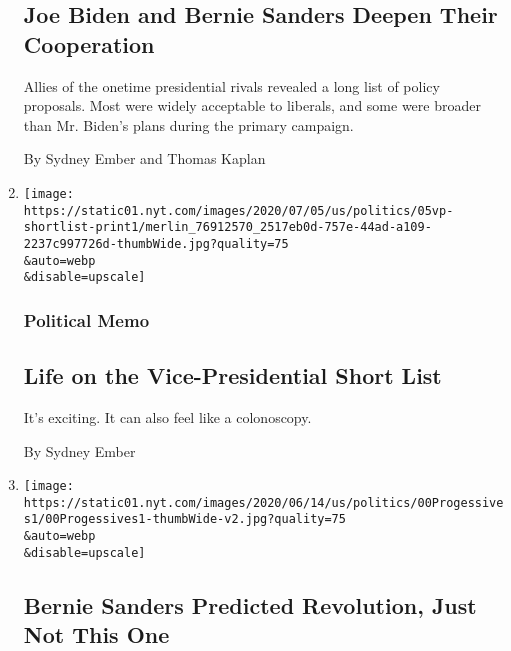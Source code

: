 \begin{enumerate}
  \hypertarget{joe-biden-and-bernie-sanders-deepen-their-cooperation}{%
  \subsection{Joe Biden and Bernie Sanders Deepen Their
  Cooperation}\label{joe-biden-and-bernie-sanders-deepen-their-cooperation}}

  Allies of the onetime presidential rivals revealed a long list of
  policy proposals. Most were widely acceptable to liberals, and some
  were broader than Mr. Biden's plans during the primary campaign.

  By Sydney Ember and Thomas Kaplan
\item
  \href{/2020/07/04/us/politics/biden-vice-president-.html}{}

  \texttt{[image: https://static01.nyt.com/images/2020/07/05/us/politics/05vp-shortlist-print1/merlin\_76912570\_2517eb0d-757e-44ad-a109-2237c997726d-thumbWide.jpg?quality=75\\\&auto=webp\\\&disable=upscale]}

  \hypertarget{political-memo}{%
  \subsubsection{Political Memo}\label{political-memo}}

  \hypertarget{life-on-the-vice-presidential-short-list}{%
  \subsection{Life on the Vice-Presidential Short
  List}\label{life-on-the-vice-presidential-short-list}}

  It's exciting. It can also feel like a colonoscopy.

  By Sydney Ember
\item
  \href{/2020/06/19/us/politics/bernie-sanders-protests.html}{}

  \texttt{[image: https://static01.nyt.com/images/2020/06/14/us/politics/00Progessives1/00Progessives1-thumbWide-v2.jpg?quality=75\\\&auto=webp\\\&disable=upscale]}

  \hypertarget{bernie-sanders-predicted-revolution-just-not-this-one}{%
  \subsection{Bernie Sanders Predicted Revolution, Just Not This
  One}\label{bernie-sanders-predicted-revolution-just-not-this-one}}


\end{enumerate}
